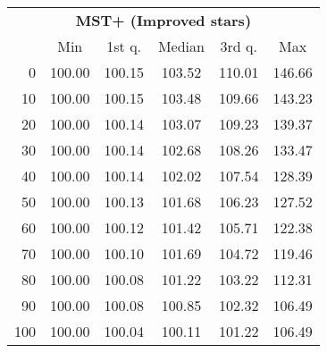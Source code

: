 \begin{tabular}{r|ccccc}
  \multicolumn{6}{c}{{\bf MST+ (Improved stars)}} \\
  & Min & 1st q. & Median & 3rd q. & Max \\ \hline\hline
  0 & 100.00 & 100.15 & 103.52 & 110.01 & 146.66
\\ 10 & 100.00 & 100.15 & 103.48 & 109.66 & 143.23
\\ 20 & 100.00 & 100.14 & 103.07 & 109.23 & 139.37
\\ 30 & 100.00 & 100.14 & 102.68 & 108.26 & 133.47
\\ 40 & 100.00 & 100.14 & 102.02 & 107.54 & 128.39
\\ 50 & 100.00 & 100.13 & 101.68 & 106.23 & 127.52
\\ 60 & 100.00 & 100.12 & 101.42 & 105.71 & 122.38
\\ 70 & 100.00 & 100.10 & 101.69 & 104.72 & 119.46
\\ 80 & 100.00 & 100.08 & 101.22 & 103.22 & 112.31
\\ 90 & 100.00 & 100.08 & 100.85 & 102.32 & 106.49
\\ 100 & 100.00 & 100.04 & 100.11 & 101.22 & 106.49
\end{tabular}
